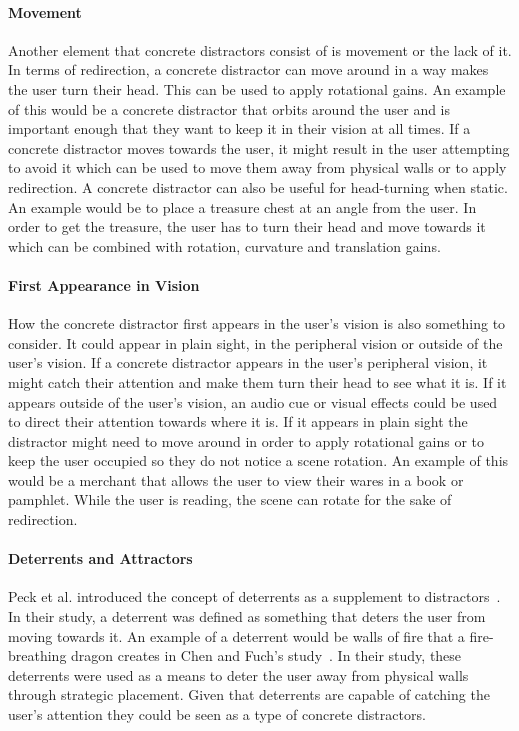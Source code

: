 \paragraph{Movement}
Another element that concrete distractors consist of is movement or the lack of it. In terms of redirection, a concrete distractor can move around in a way makes the user turn their head. This can be used to apply rotational gains. An example of this would be a concrete distractor that orbits around the user and is important enough that they want to keep it in their vision at all times. If a concrete distractor moves towards the user, it might result in the user attempting to avoid it which can be used to move them away from physical walls or to apply redirection. A concrete distractor can also be useful for head-turning when static. An example would be to place a treasure chest at an angle from the user. In order to get the treasure, the user has to turn their head and move towards it which can be combined with rotation, curvature and translation gains.

\paragraph{First Appearance in Vision}
How the concrete distractor first appears in the user's vision is also something to consider. It could appear in plain sight, in the peripheral vision or outside of the user's vision. If a concrete distractor appears in the user's peripheral vision, it might catch their attention and make them turn their head to see what it is. If it appears outside of the user's vision, an audio cue or visual effects could be used to direct their attention towards where it is. If it appears in plain sight the distractor might need to move around in order to apply rotational gains or to keep the user occupied so they do not notice a scene rotation. An example of this would be a merchant that allows the user to view their wares in a book or pamphlet. While the user is reading, the scene can rotate for the sake of redirection. 
         
\paragraph{Deterrents and Attractors}
Peck et al. introduced the concept of deterrents as a supplement to distractors~\cite{peck2011evaluation}. In their study, a deterrent was defined as something that deters the user from moving towards it. An example of a deterrent would be walls of fire that a fire-breathing dragon creates in Chen and Fuch's study~\cite{chen2017supporting}. In their study, these deterrents were used as a means to deter the user away from physical walls through strategic placement. Given that deterrents are capable of catching the user's attention they could be seen as a type of concrete distractors. 

